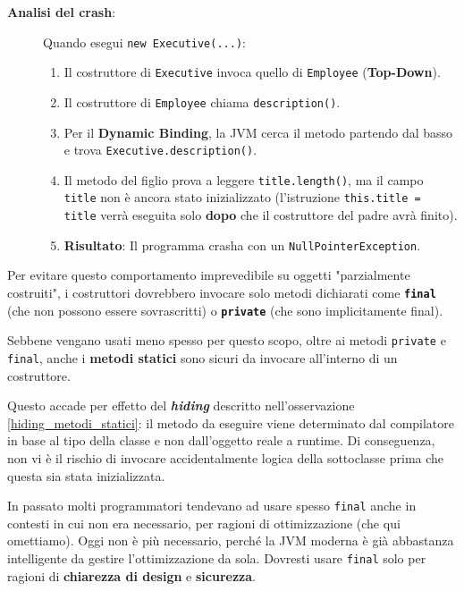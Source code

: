 \begin{description}
    \item[\textbf{Analisi del crash}:] 
    Quando esegui \texttt{new Executive(...)}:
    \begin{enumerate}
        \item Il costruttore di \texttt{Executive} invoca quello di \texttt{Employee} (\textbf{Top-Down}).
        \item Il costruttore di \texttt{Employee} chiama \texttt{description()}.
        \item Per il \textbf{Dynamic Binding}, la JVM cerca il metodo partendo dal basso e trova \texttt{Executive.description()}.
        \item Il metodo del figlio prova a leggere \texttt{title.length()}, ma il campo \texttt{title} non è ancora stato inizializzato (l'istruzione \texttt{this.title = title} verrà eseguita solo \textbf{dopo} che il costruttore del padre avrà finito).
        \item \textbf{Risultato}: Il programma crasha con un \texttt{NullPointerException}.
    \end{enumerate}
\end{description}



\begin{tip}[Soluzione]
    Per evitare questo comportamento imprevedibile su oggetti "parzialmente costruiti", i costruttori dovrebbero invocare solo metodi dichiarati come \textbf{\texttt{final}} (che non possono essere sovrascritti) o \textbf{\texttt{private}} (che sono implicitamente final).
\end{tip}

\begin{observation}
    Sebbene vengano usati meno spesso per questo scopo, oltre ai metodi \texttt{private} e \texttt{final}, anche i \textbf{metodi statici} sono sicuri da invocare all'interno di un costruttore. 
    
    Questo accade per effetto del \textbf{\textit{hiding}} descritto nell'osservazione \ref{hiding_metodi_statici}: il metodo da eseguire viene determinato dal compilatore in base al tipo della classe e non dall'oggetto reale a runtime. Di conseguenza, non vi è il rischio di invocare accidentalmente logica della sottoclasse prima che questa sia stata inizializzata.
\end{observation}

\begin{bestpractice}
    In passato molti programmatori tendevano ad usare spesso \texttt{final} anche in contesti in cui non era necessario, per ragioni di ottimizzazione (che qui omettiamo). Oggi non è più necessario, perché la JVM moderna è già abbastanza intelligente da gestire l'ottimizzazione da sola. Dovresti usare \texttt{final} solo per ragioni di \textbf{chiarezza di design} e \textbf{sicurezza}.
\end{bestpractice}


